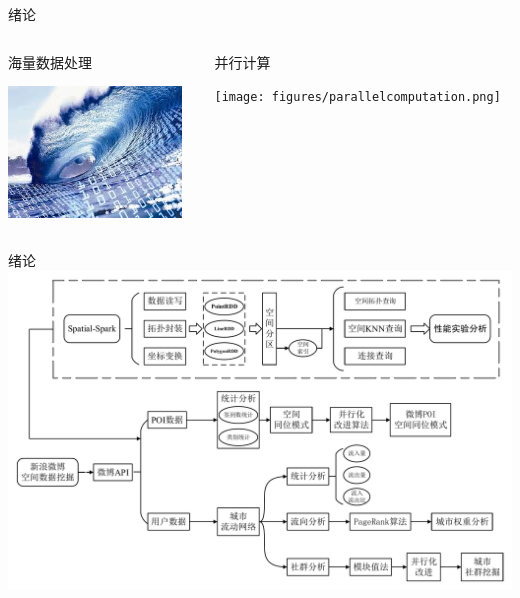\begin{frame}[t]{绪论}



\begin{columns}
    \begin{column}{0.4 \textwidth}

        \begin{center}
        \alert{海量数据处理}

        \vspace{1em}
        \includegraphics[height=3.5cm]{figures/seaamountdata.jpeg}
        \end{center}


    \end{column}

    \pause
    \begin{column}{0.6 \textwidth}

        \begin{center}
            \alert{并行计算}

            \vspace{1em}
            \texttt{[image: figures/parallelcomputation.png]}
        \end{center}
       
    \end{column}

\end{columns}




\end{frame}

\begin{frame}[c]{绪论}
    \includegraphics[scale=0.3]{figures/technology_route.pdf}
\end{frame}
